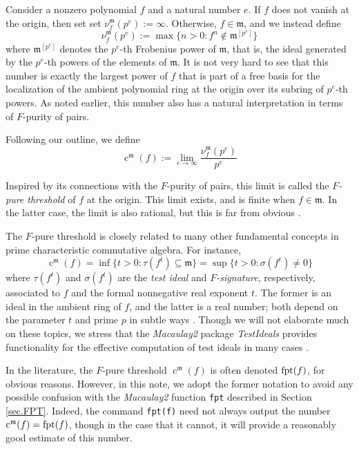 \documentclass{amsart}
\newcommand{\ft}{\operatorname{c}}
\newcommand{\idealm}{\mathfrak{m}}
\begin{document}
Consider a nonzero polynomial $f$ and a natural number $e$.  If $f$ does not vanish at the origin, then set set $\nu_f^{\idealm}(p^e) := \infty$.  Otherwise, $f \in \idealm$, and we instead define
\[ \nu_f^{\idealm}(p^e) := \max \{ n>0 : f^n \notin \idealm^{[p^e]} \} \]
where $\idealm^{[p^e]}$ denotes the $p^e$-th Frobenius power of $\idealm$, that is, the ideal generated by the $p^e$-th powers of the elements of $\idealm$.    It is not very hard to see that this number is exactly the largest power of $f$ that is part of a free basis for the localization of the ambient polynomial ring at the origin over its subring of $p^e$-th powers.  As noted earlier, this number also has a natural interpretation in terms of $F$-purity of pairs.

Following our outline, we define
\[ \ft^{\idealm}(f) := \lim_{e \to \infty} \frac{ \nu_f^{\idealm}(p^e)}{p^e} \]

Inspired by its connections with the $F$-purity of pairs,  this limit is called the \emph{$F$-pure threshold} of $f$ at the origin.  This limit exists, and is finite when $f \in \idealm$.  In the latter case, the limit is also rational, but this is far from obvious  \cite{BlickleMustataSmithDiscretenessAndRationalityOfFThresholds}.

The $F$-pure threshold is closely related to many other fundamental concepts in prime characteristic commutative algebra.   For instance,
\[ \ft^{\idealm}(f) = \inf \{ t>0 : \tau(f^t)  \subseteq \idealm \} = \sup \{ t>0 : \sigma( f^t) \neq 0 \} \]
where $\tau(f^t)$ and $\sigma(f^t)$ are the \emph{test ideal} and \emph{$F$-signature}, respectively, associated to $f$ and the formal nonnegative real exponent $t$.  The former is an ideal in the ambient ring of $f$, and the latter is a real number;  both depend on the parameter $t$ and prime $p$ in subtle ways \cite{BlickleMustataSmithDiscretenessAndRationalityOfFThresholds, BlickleSchwedeTuckerFSigPairs1}.
Though we will not elaborate much on these topics,  we stress that the \emph{Macaulay2} package \emph{TestIdeals} provides functionality for the effective computation of test ideals in many cases \cite{TestIdealsPackage, TestIdealsPaper}.

In the literature, the $F$-pure threshold $\ft^{\idealm}(f)$ is often denoted $\operatorname{{fpt}}(f)$, for obvious reasons.  However, in this note, we adopt the former notation to avoid any possible confusion with the \emph{Macaulay2} function {\tt fpt} described in Section \ref{sec.FPT}.  Indeed, the command {\tt fpt(f)} need not always output the number $\ft^{\idealm}(f) = \fpt(f)$, though in the case that it cannot, it will provide a reasonably good estimate of this number.
\end{document}
